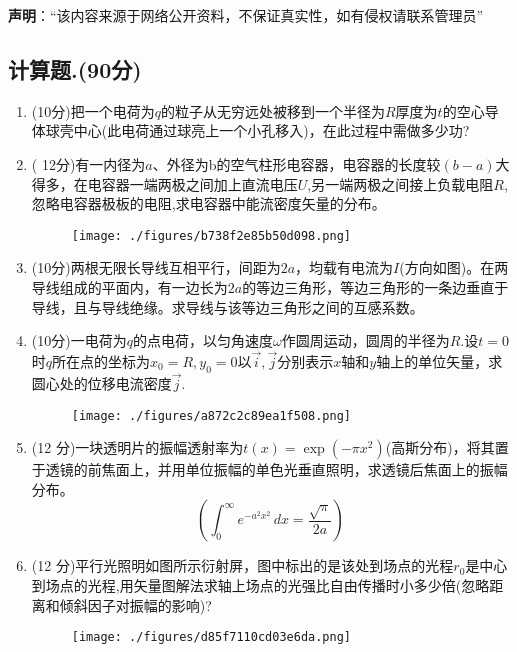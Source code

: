 
\textbf{声明}：“该内容来源于网络公开资料，不保证真实性，如有侵权请联系管理员”

\subsection{计算题.(90分)}
\begin{enumerate}
\item (10分)把一个电荷为$q$的粒子从无穷远处被移到一个半径为$R$厚度为$t$的空心导体球壳中心(此电荷通过球亮上一个小孔移入)，在此过程中需做多少功?
\item ( 12分)有一内径为$a$、外径为b的空气柱形电容器，电容器的长度较$(b-a)$大得多，在电容器一端两极之间加上直流电压$U$,另一端两极之间接上负载电阻$R$,忽略电容器极板的电阻,求电容器中能流密度矢量的分布。
\begin{figure}[ht]
\centering
\texttt{[image: ./figures/b738f2e85b50d098.png]}
\caption{} \label{fig_CD08_1}
\end{figure}
\item (10分)两根无限长导线互相平行，间距为$2a$，均载有电流为$I$(方向如图)。在两导线组成的平面内，有一边长为$2a$的等边三角形，等边三角形的一条边垂直于导线，且与导线绝缘。求导线与该等边三角形之间的互感系数。
\item (10分)一电荷为$q$的点电荷，以匀角速度$\omega$作圆周运动，圆周的半径为$R$.设$t=0$时$q$所在点的坐标为$x_0=R,y_0=0$以$\vec{i},\vec{j}$分别表示$x$轴和$y$轴上的单位矢量，求圆心处的位移电流密度$\vec{j}$.
\begin{figure}[ht]
\centering
\texttt{[image: ./figures/a872c2c89ea1f508.png]}
\caption{} \label{fig_CD08_2}
\end{figure}
\item (12 分)一块透明片的振幅透射率为$t(x)=\exp(-\pi x^2)$(高斯分布)，将其置于透镜的前焦面上，并用单位振幅的单色光垂直照明，求透镜后焦面上的振幅分布。
\[
\left( \int_0^{\infty} e^{-a^2 x^2} \, dx = \frac{\sqrt{\pi}}{2a} \right)~
\]
\item (12 分)平行光照明如图所示衍射屏，图中标出的是该处到场点的光程$r_0$是中心到场点的光程,用矢量图解法求轴上场点的光强比自由传播时小多少倍(忽略距离和倾斜因子对振幅的影响)?
\begin{figure}[ht]
\centering
\texttt{[image: ./figures/d85f7110cd03e6da.png]}
\caption{} \label{fig_CD08_3}
\end{figure}
\end{enumerate}
